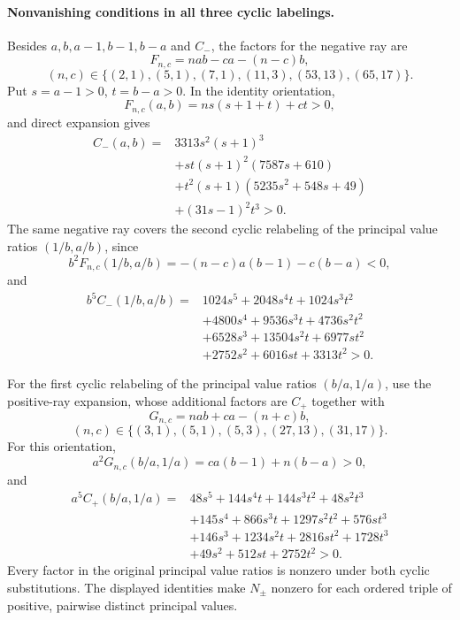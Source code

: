 \documentclass[11pt,a4paper]{article}
\numberwithin{equation}{section}
\theoremstyle{plain}
\theoremstyle{definition}
\theoremstyle{remark}
\begin{document}
\paragraph{Nonvanishing conditions in all three cyclic labelings.}
Besides $a,b,a-1,b-1,b-a$ and $C_-$, the factors for the negative ray
are
\[
 F_{n,c}=nab-ca-(n-c)b,
\]
\[
 (n,c)\in\{(2,1),(5,1),(7,1),(11,3),(53,13),(65,17)\}.
\]
Put $s=a-1>0$, $t=b-a>0$.  In the identity orientation,
\[
 F_{n,c}(a,b)=ns(s+1+t)+ct>0,
\]
and direct expansion gives
\begin{align*}
 C_-(a,b)={}&3313s^2(s+1)^3\\
 &+st(s+1)^2(7587s+610)\\
 &+t^2(s+1)(5235s^2+548s+49)\\
 &+(31s-1)^2t^3>0.
\end{align*}
The same negative ray covers the second cyclic relabeling of the principal value ratios
$(1/b,a/b)$, since
\[
 b^2F_{n,c}(1/b,a/b)
   =-(n-c)a(b-1)-c(b-a)<0,
\]
and
\begin{align*}
 b^5C_-(1/b,a/b)={}&1024s^5+2048s^4t+1024s^3t^2\\
 &+4800s^4+9536s^3t+4736s^2t^2\\
 &+6528s^3+13504s^2t+6977st^2\\
 &+2752s^2+6016st+3313t^2>0.
\end{align*}

For the first cyclic relabeling of the principal value ratios $(b/a,1/a)$,
use the positive-ray expansion, whose additional factors are $C_+$ together with
\[
 G_{n,c}=nab+ca-(n+c)b,
\]
\[
 (n,c)\in\{(3,1),(5,1),(5,3),(27,13),(31,17)\}.
\]
For this orientation,
\[
 a^2G_{n,c}(b/a,1/a)=ca(b-1)+n(b-a)>0,
\]
and
\begin{align*}
 a^5C_+(b/a,1/a)={}&48s^5+144s^4t+144s^3t^2+48s^2t^3\\
 &+145s^4+866s^3t+1297s^2t^2+576st^3\\
 &+146s^3+1234s^2t+2816st^2+1728t^3\\
 &+49s^2+512st+2752t^2>0.
\end{align*}
Every factor in the original principal value ratios is nonzero under both cyclic substitutions.
The displayed identities make $N_\pm$ nonzero for each ordered
triple of positive, pairwise distinct principal values.
\end{document}
